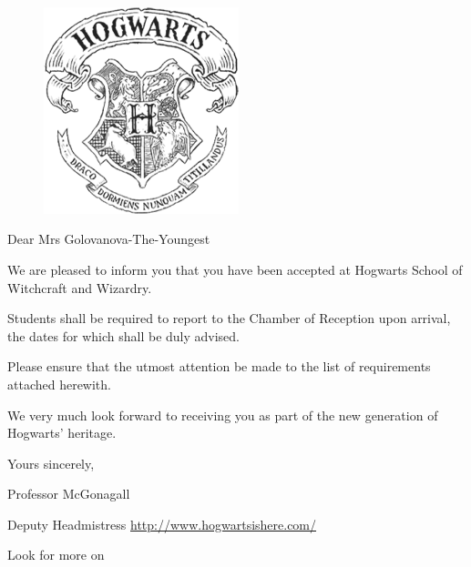 \documentclass[14pt,a4paper]{article}
\begin{document}
\pagestyle{empty}
 \begin{figure}
 \begin{center} 
 \includegraphics[width=0.4\linewidth, height=6cm]{gerb.png}
 \end{center} 
 \end{figure}
 \vspace{1cm}

 
{\fontsize{12}{1.33}\selectfont Dear Mrs Golovanova-The-Youngest}

 
 \vspace{2.5cm}

We are pleased to inform you that you have been accepted at Hogwarts School of Witchcraft and Wizardry. 

Students shall be required to report to the Chamber of Reception upon arrival, the dates for which shall be duly advised.
 
Please ensure that the utmost attention be made to the list of requirements attached herewith. 

We very much look forward to receiving you as part of the new generation of Hogwarts' heritage. 

 \vfill
 
Yours sincerely,

{}

Professor McGonagall 

Deputy Headmistress \url{http://www.hogwartsishere.com/}

\begin{center} 
\footnotesize Look for more on %
\end{center}
 
\end{document}
